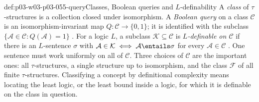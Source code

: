 \begin{hbdefinition}{def:p03-w03-p03-055-query}{Classes, Boolean queries and \(L\)-definability}
A \emph{class} of \(\tau\)-structures is a collection closed under
isomorphism. A \emph{Boolean query} on a class \(\mathcal C\) is an
isomorphism-invariant map \(Q\colon\mathcal C\to\{0,1\}\); it is identified
with the subclass \(\{\mathcal A\in\mathcal C:Q(\mathcal A)=1\}\)
\cite[Def.~2.1, p.~4]{Kolaitis2003ExpressivePowerNotes}. For a logic \(L\),
a subclass \(\mathcal K\subseteq\mathcal C\) is \emph{\(L\)-definable on
\(\mathcal C\)} if there is an \(L\)-sentence \(\sigma\) with
\(\mathcal A\in\mathcal K\iff\mathcal A\entails\sigma\) for every
\(\mathcal A\in\mathcal C\)
\cite[Def.~2.3, p.~5]{Kolaitis2003ExpressivePowerNotes}. One sentence must
work uniformly on all of \(\mathcal C\). Three choices of \(\mathcal C\) are
the important ones: all \(\tau\)-structures, a single structure up to
isomorphism, and the class \(\mathcal F\) of all finite \(\tau\)-structures.
Classifying a concept by definitional complexity means locating the least
logic, or the least bound inside a logic, for which it is definable on the
class in question.
\end{hbdefinition}

